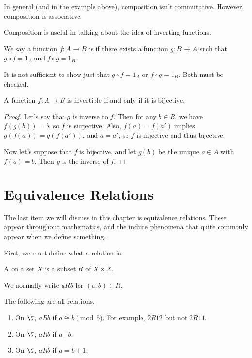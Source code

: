 \documentclass[a4paper]{scrreprt}
\begin{document}
In general (and in the example above), composition isn't commutative. However, composition is associative.

Composition is useful in talking about the idea of inverting functions.

\begin{definition}
	We say a function $f: A \rightarrow B$ is  if there exists a function $g: B \rightarrow A$ such that $g \circ f = 1_A$ and $f \circ g = 1_B$.
\end{definition}

\begin{remark}
	It is not sufficient to show just that $g \circ f = 1_A$ or $f \circ g = 1_B$. Both must be checked.
\end{remark}

\begin{proposition}
	A function $f : A \rightarrow B$ is invertible if and only if it is bijective.
\end{proposition}
\begin{proof}
	Let's say that $g$ is inverse to $f$. Then for any $b \in B$, we have $f(g(b)) = b$, so $f$ is surjective. Also, $f(a) = f(a')$ implies $g(f(a)) = g(f(a'))$, and $a = a'$, so $f$ is injective and thus bijective.

	Now let's suppose that $f$ is bijective, and let $g(b)$ be the unique $a \in A$ with $f(a) = b$. Then $g$ is the inverse of $f$.
\end{proof}

\section{Equivalence Relations}

The last item we will discuss in this chapter is equivalence relations. These appear throughout mathematics, and the induce phenomena that quite commonly appear when we define something. 

First, we must define what a relation is.

\begin{definition}[Relation]
	A  on a set $X$ is a subset $R$ of $X \times X$.
\end{definition}
We normally write $a R b$ for $(a, b) \in R$.

\begin{example}
	The following are all relations.
	\begin{enumerate}[label=(\roman*)]
		\item On $\N$, $a R b$ if $a \cong b \pmod{5}$. For example, $2 R 12$ but not $2 R 11$.
		\item On $\N$, $aR b$ if $a \mid b$.
		\item On $\N$, $aRb$ if $a = b \pm 1$.
	\end{enumerate}
\end{example}
\end{document}
